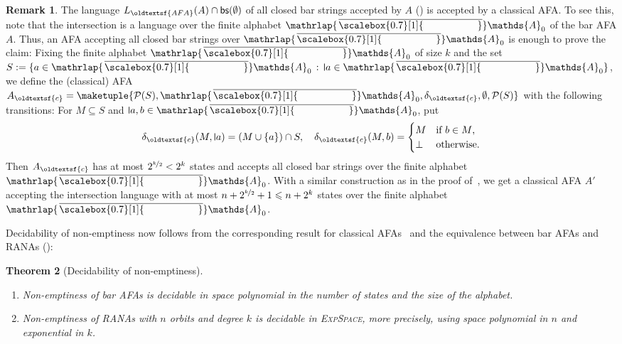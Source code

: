 \documentclass[10pt,a4paper]{amsart}
\newtheorem{theo}{Theorem}[section]
\theoremstyle{definition}
\newtheorem{rem}[theo]{Remark}
\renewcommand{\textsf}[1]{{\oldtextsf{\small#1}}}
\newcommand{\seq}{\subseteq}
\newcommand{\At}{\mathds{A}}
\newcommand{\bars}{\mathsf{bs}}
\newcommand{\names}{\At}
\newcommand{\pow}{\mathcal{P}}
\newcommand{\set}[1]{\{#1\}}
\newcommand{\setw}[2]{\{#1\,:\,#2\}}
\newcommand{\mybar}[3]{%
  \mathrlap{\hspace{#2}\overline{\scalebox{#1}[1]{\phantom{\ensuremath{#3}}}}}\ensuremath{#3}
}
\newcommand{\barNames}{{\mybar{0.7}{1.25pt}{\names}}}
\newcommand{\midmid}{\hspace{0.2ex}{\rule[-0.1ex]{0.6pt}{1.65ex}}\hspace{0.2ex}}
\newcommand{\newletter}[1]{{\midmid}#1}
\newcommand{\EXPSPACE}{\textsc{ExpSpace}\xspace}
\begin{document}
\begin{rem}\label{rem:fixAFA}
  The language $L_{\textsf{\scriptsize AFA}}(A) \cap \bars(\emptyset)$ of all closed bar
  strings accepted by $A$ () is accepted by a classical AFA. To see
  this, note that the intersection is a language over the finite alphabet $\barNames_0$ of the
  bar AFA $A$. Thus, an AFA accepting all closed bar strings over $\barNames_0$ is enough to
  prove the claim: Fixing the finite alphabet $\barNames_0$ of size $k$ and the set
  $S := \setw{a \in \barNames_0}{\newletter{a} \in \barNames_0}$, we define the (classical) AFA
  $A_{\textsf{\scriptsize c}} = \maketuple{\pow(S), \barNames_0, \delta_{\textsf{\scriptsize
        c}}, \emptyset, \pow(S)}$ with the following transitions: For $M \seq S$ and
  $\newletter{a}, b \in \barNames_0$, put
  \[
    \delta_{\textsf{\scriptsize c}}(M, \newletter{a}) = (M \cup \set{a}) \cap S, \quad
    \delta_{\textsf{\scriptsize c}}(M, b)
    =
    \begin{cases}
      M & \text{if $b \in M$,} \\
      \bot & \text{otherwise.}
    \end{cases}
  \]
  Then  
  $A_{\textsf{\scriptsize c}}$ has at most $2^{\nicefrac{k}{2}} < 2^k$ states and accepts all closed bar strings over the finite alphabet $\barNames_0$. 
  With a similar construction as in the proof of~, we get a classical AFA $A'$ accepting
  the intersection language with at most $n + 2^{\nicefrac{k}{2}} + 1 \leqslant n + 2^k$ states over the finite
  alphabet $\barNames_0$.
\end{rem}

Decidability of non-emptiness now follows from the corresponding result for classical AFAs~\cite[Thm.~3.1]{jr91}
and the equivalence between bar AFAs and RANAs ():

\begin{theo}[Decidability of non-emptiness]
  \label{thm:decneRANA}
  \begin{enumerate}%
    \item Non-emptiness of bar AFAs is decidable
      in space polynomial in the number of states and the size of the alphabet.
    \item Non-emptiness of RANAs with $n$ orbits and degree $k$ 
      is decidable in \EXPSPACE, more precisely, using space polynomial in $n$
      and exponential in $k$.
  \end{enumerate}
\end{theo}
\end{document}
